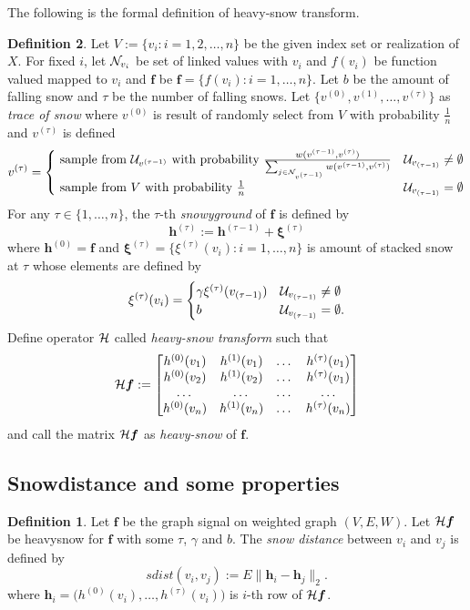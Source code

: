 \documentclass[preprint, review, 12pt]{article}
\theoremstyle{definition}
\newtheorem{dfn}{Definition}
\theoremstyle{remark}
\begin{document}
The following is the formal definition of heavy-snow transform.
\begin{dfn}\label{snow:df_hst}
Let $V:=\{v_i:i=1,2,\dots,n\}$ be the given index set or realization of $X$. For fixed $i$, let ${\cal N}_{v_i}$ be set of linked values with $v_i$ and $f(v_i)$ be function valued mapped to $v_i$ and $\boldsymbol f$ be ${\boldsymbol f}=\{f(v_i): i=1,\dots,n \}$. Let $b$ be the amount of falling snow and $\tau$ be the number of falling snows. Let $\{v^{(0)},v^{(1)},\dots,v^{(\tau)}\}$ as \emph{trace of snow} where $v^{(0)}$ is result of randomly select from $V$ with probability $\frac{1}{n}$ and $v^{(\tau)}$ is defined
\[
v^{(\tau)}=\begin{cases}
\mbox{ sample from } {\cal U}_{v^{(\tau-1)}} \mbox{ with probability } \frac{w(v^{(\tau-1)},v^{(\tau)})}{\sum_{j \in {\cal N}_{v^{(\tau-1)}}}w(v^{(\tau-1)},v^{(\tau)})}  & {\cal U}_{v_{(\tau-1)}}\neq \emptyset \\ 
\mbox{ sample from } V \mbox{ with probability  } \frac{1}{n}  & {\cal U}_{v_{(\tau-1)}}= \emptyset 
\end{cases}
\]
For any $\tau \in \{1,\dots,n\}$, the $\tau$-th \emph{snowyground} of ${\boldsymbol f}$ is defined by 
\[
{\boldsymbol h}^{(\tau)} := {\boldsymbol h}^{(\tau-1)}+{\boldsymbol \xi}^{(\tau)}
\]
where ${\boldsymbol h}^{(0)}={\boldsymbol f}$ and ${\boldsymbol \xi}^{(\tau)}=\{\xi^{(\tau)}(v_i): i=1,\dots,n\}$ is amount of stacked snow at $\tau$ whose elements are defined by 
\[
\xi^{(\tau)}(v_i)=	\begin{cases}
\gamma \xi^{(\tau)}(v_{(\tau-1)})  & {\cal U}_{v_{(\tau-1)}}\neq \emptyset \\ 
b &  {\cal U}_{v_{(\tau-1)}} = \emptyset. \\ 
\end{cases}
\]
Define operator ${\cal H}$ called \emph{heavy-snow transform} such that
\[
{\cal H}{\boldsymbol f}:=\begin{bmatrix} 
h^{(0)}(v_1) & h^{(1)}(v_1) & \dots & h^{(\tau)}(v_1) \\ 
h^{(0)}(v_2) & h^{(1)}(v_2) & \dots & h^{(\tau)}(v_1) \\ 
\dots  & \dots & \dots & \dots \\ 
h^{(0)}(v_n) & h^{(1)}(v_n) & \dots & h^{(\tau)}(v_n) \end{bmatrix}
\]
and call the matrix ${\cal H}{\boldsymbol f}$ as \emph{heavy-snow} of ${\boldsymbol f}$. 


\subsection{Snowdistance and some properties} 
\begin{dfn}
Let ${\boldsymbol f}$ be the graph signal on weighted graph $(V,E,W)$. Let ${\cal H}{\boldsymbol f}$ be heavysnow for ${\boldsymbol f}$ with some $\tau$, $\gamma$ and $b$. The \emph{snow distance} between $v_i$ and $v_j$ is defined by 
\[
sdist(v_i , v_j) := E\|{\boldsymbol h}_i- {\boldsymbol h}_j\|_2.
\]
where ${\boldsymbol h}_i=\big(h^{(0)}(v_i),\dots,h^{(\tau)}(v_i)\big)$ is $i$-th row of ${\cal H}{\boldsymbol f}$.
\end{dfn}


\end{dfn}
\end{document}
